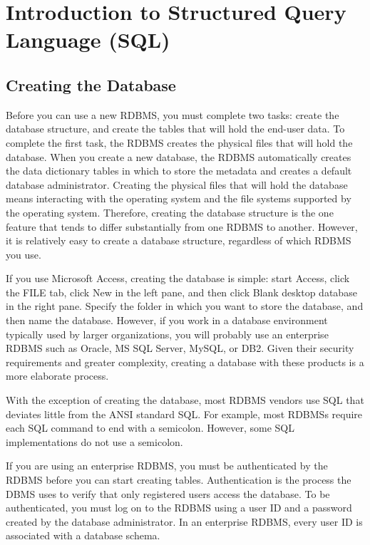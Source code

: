 \chapter{Introduction to Structured Query Language (SQL)}

\section{Creating the Database}

Before you can use a new RDBMS, you must complete two tasks: create the database structure, and create the tables
that will hold the end-user data. To complete the first task, the RDBMS creates the physical files that will hold the
database. When you create a new database, the RDBMS automatically creates the data dictionary tables in which to
store the metadata and creates a default database administrator. Creating the physical files that will hold the database
means interacting with the operating system and the file systems supported by the operating system. Therefore, creating
the database structure is the one feature that tends to differ substantially from one RDBMS to another. However, it
is relatively easy to create a database structure, regardless of which RDBMS you use.

If you use Microsoft Access, creating the database is simple: start Access, click the FILE tab, click New in the left pane,
and then click Blank desktop database in the right pane. Specify the folder in which you want to store the database, and
then name the database. However, if you work in a database environment typically used by larger organizations, you
will probably use an enterprise RDBMS such as Oracle, MS SQL Server, MySQL, or DB2. Given their security requirements
and greater complexity, creating a database with these products is a more elaborate process. 

With the exception of creating the database, most RDBMS vendors use SQL that deviates little from the ANSI standard
SQL. For example, most RDBMSs require each SQL command to end with a semicolon. However, some SQL
implementations do not use a semicolon. 


If you are using an enterprise RDBMS, you must be authenticated by the RDBMS before you can start creating tables.
Authentication is the process the DBMS uses to verify that only registered users access the database. To be authenticated,
you must log on to the RDBMS using a user ID and a password created by the database administrator. In an
enterprise RDBMS, every user ID is associated with a database schema.


